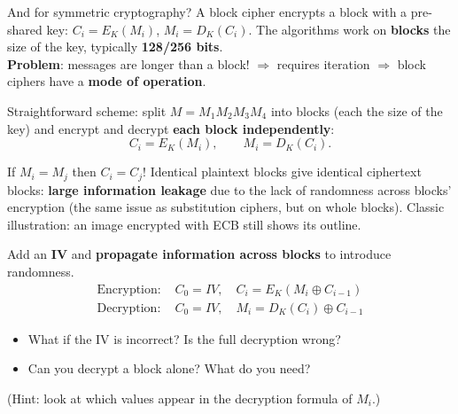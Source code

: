 \begin{defnbox}[title=Block cipher]
And for symmetric cryptography? A block cipher encrypts a block with a pre-shared key:
$C_i = E_K(M_i)$, $M_i = D_K(C_i)$. The algorithms work on \textbf{blocks} the size of the
key, typically \textbf{128/256 bits}. \\
\textbf{Problem}: messages are longer than a block! $\Rightarrow$ requires iteration
$\Rightarrow$ block ciphers have a \textbf{mode of operation}.
\end{defnbox}

\begin{defnbox}[title={Mode 1: Electronic Code Book (ECB)}]
Straightforward scheme: split $M = M_1 M_2 M_3 M_4$ into blocks (each the size of the key)
and encrypt and decrypt \textbf{each block independently}:
\[
  C_i = E_K(M_i), \qquad M_i = D_K(C_i).
\]
\end{defnbox}

\begin{warnbox}[title=The problem with ECB]
If $M_i = M_j$ then $C_i = C_j$! Identical plaintext blocks give identical ciphertext
blocks: \textbf{large information leakage} due to the lack of randomness across blocks'
encryption (the same issue as substitution ciphers, but on whole blocks). Classic
illustration: an image encrypted with ECB still shows its outline.
\end{warnbox}

\begin{defnbox}[title={Mode 2: Cipher Block Chaining (CBC)}]
Add an \textbf{IV} and \textbf{propagate information across blocks} to introduce
randomness.
\begin{align*}
  \text{Encryption: } & C_0 = IV, \quad C_i = E_K(M_i \oplus C_{i-1}) \\
  \text{Decryption: } & C_0 = IV, \quad M_i = D_K(C_i) \oplus C_{i-1}
\end{align*}
\end{defnbox}

\begin{rembox}[title=Questions from the lecture]
\begin{itemize}
  \item What if the IV is incorrect? Is the full decryption wrong?
  \item Can you decrypt a block alone? What do you need?
\end{itemize}
(Hint: look at which values appear in the decryption formula of $M_i$.)
\end{rembox}

